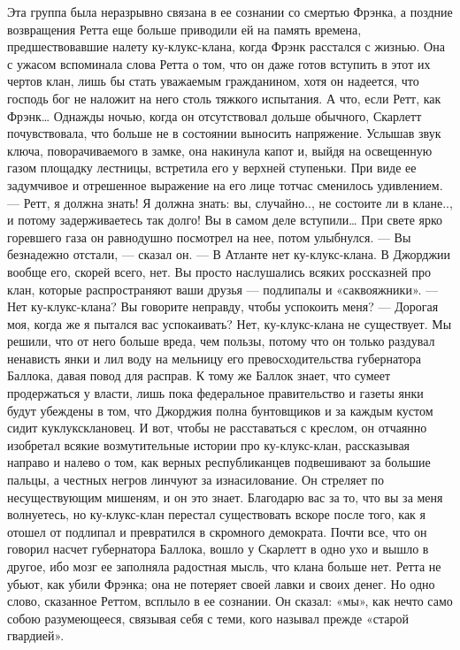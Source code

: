 Эта группа была неразрывно связана в ее сознании со смертью Фрэнка, а поздние возвращения Ретта еще больше приводили ей на память времена, предшествовавшие налету ку-клукс-клана, когда Фрэнк расстался с жизнью. Она с ужасом вспоминала слова Ретта о том, что он даже готов вступить в этот их чертов клан, лишь бы стать уважаемым гражданином, хотя он надеется, что господь бог не наложит на него столь тяжкого испытания. А что, если Ретт, как Фрэнк…
Однажды ночью, когда он отсутствовал дольше обычного, Скарлетт почувствовала, что больше не в состоянии выносить напряжение. Услышав звук ключа, поворачиваемого в замке, она накинула капот и, выйдя на освещенную газом площадку лестницы, встретила его у верхней ступеньки. При виде ее задумчивое и отрешенное выражение на его лице тотчас сменилось удивлением.
— Ретт, я должна знать! Я должна знать: вы, случайно.., не состоите ли в клане.., и потому задерживаетесь так долго! Вы в самом деле вступили…
При свете ярко горевшего газа он равнодушно посмотрел на нее, потом улыбнулся.
— Вы безнадежно отстали, — сказал он. — В Атланте нет ку-клукс-клана. В Джорджии вообще его, скорей всего, нет. Вы просто наслушались всяких россказней про клан, которые распространяют ваши друзья — подлипалы и «саквояжники».
— Нет ку-клукс-клана? Вы говорите неправду, чтобы успокоить меня?
— Дорогая моя, когда же я пытался вас успокаивать? Нет, ку-клукс-клана не существует. Мы решили, что от него больше вреда, чем пользы, потому что он только раздувал ненависть янки и лил воду на мельницу его превосходительства губернатора Баллока, давая повод для расправ. К тому же Баллок знает, что сумеет продержаться у власти, лишь пока федеральное правительство и газеты янки будут убеждены в том, что Джорджия полна бунтовщиков и за каждым кустом сидит куклуксклановец. И вот, чтобы не расставаться с креслом, он отчаянно изобретал всякие возмутительные истории про ку-клукс-клан, рассказывая направо и налево о том, как верных республиканцев подвешивают за большие пальцы, а честных негров линчуют за изнасилование. Он стреляет по несуществующим мишеням, и он это знает. Благодарю вас за то, что вы за меня волнуетесь, но ку-клукс-клан перестал существовать вскоре после того, как я отошел от подлипал и превратился в скромного демократа.
Почти все, что он говорил насчет губернатора Баллока, вошло у Скарлетт в одно ухо и вышло в другое, ибо мозг ее заполняла радостная мысль, что клана больше нет. Ретта не убьют, как убили Фрэнка; она не потеряет своей лавки и своих денег. Но одно слово, сказанное Реттом, всплыло в ее сознании. Он сказал:
«мы», как нечто само собою разумеющееся, связывая себя с теми, кого называл прежде «старой гвардией».
